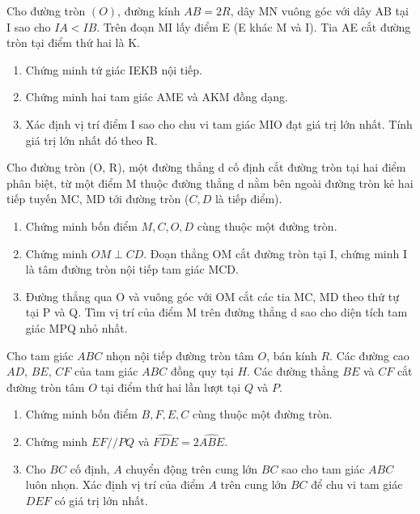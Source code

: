 \documentclass[%
    fontsize=12pt,%
    chapterprefix=false,%
    open=right,%
    twoside=false,%
    numbers=noenddot,%
    headings=optiontohead,%
    final,%
    DIV=15,%
    parskip=half %
]{scrbook}
\begin{document}
\begin{tuluan}
\item Cho đường tròn $(O)$, đường kính $ AB = 2R $, dây MN vuông góc với dây AB tại I sao cho $ IA < IB $. Trên đoạn MI lấy điểm E (E khác M và I). Tia AE cắt đường tròn tại điểm thứ hai là K.
\begin{enumerate}[label=\alph*)]
  \item[a)] Chứng minh tứ giác IEKB nội tiếp.
  \item[b)] Chứng minh hai tam giác AME và AKM đồng dạng.
  \item[c)] Xác định vị trí điểm I sao cho chu vi tam giác MIO đạt giá trị lớn nhất. Tính giá trị lớn nhất đó theo R.
\end{enumerate}

\item Cho đường tròn (O, R), một đường thẳng d cố định cắt đường tròn tại hai điểm phân biệt, từ một điểm M thuộc đường thẳng d nằm bên ngoài đường tròn kẻ hai tiếp tuyến MC, MD tới đường tròn ($ C, D $ là tiếp điểm).
\begin{enumerate}[label=\alph*)]
  \item[a)] Chứng minh bốn điểm $ M, C, O, D $ cùng thuộc một đường tròn.
  \item[b)] Chứng minh $ OM \perp CD $. Đoạn thẳng OM cắt đường tròn tại I, chứng minh I là tâm đường tròn nội tiếp tam giác MCD.
  \item[c)] Đường thẳng qua O và vuông góc với OM cắt các tia MC, MD theo thứ tự tại P và Q. Tìm vị trí của điểm M trên đường thẳng d sao cho diện tích tam giác MPQ nhỏ nhất.
\end{enumerate}

\item Cho tam giác $ABC$ nhọn nội tiếp đường tròn tâm $O$, bán kính $R$. Các đường cao $AD$, $BE$, $CF$ của tam giác $ABC$ đồng quy tại $H$. Các đường thẳng $BE$ và $CF$ cắt đường tròn tâm $O$ tại điểm thứ hai lần lượt tại $Q$ và $P$.
\begin{enumerate}[label=\alph*)]
  \item[a)] Chứng minh bốn điểm $B, F, E, C$ cùng thuộc một đường tròn.
  \item[b)] Chứng minh $EF // PQ$ và $\widehat{FDE} = 2\widehat{ABE}$.
  \item[c)] Cho $BC$ cố định, $A$ chuyển động trên cung lớn $BC$ sao cho tam giác $ABC$ luôn nhọn. Xác định vị trí của điểm $A$ trên cung lớn $BC$ để chu vi tam giác $DEF$ có giá trị lớn nhất.
\end{enumerate}


\end{tuluan}
\end{document}
